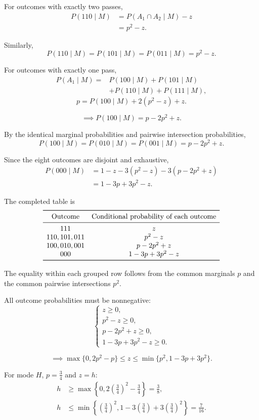 \documentclass[11pt,a4paper]{article}
\newcommand{\Prob}{P}
\begin{document}
\begin{enumerate}
For outcomes with exactly two passes,
\[
\begin{aligned}
\Prob(110\mid M)
&=\Prob(A_1\cap A_2\mid M)-z\\
&=p^2-z.
\end{aligned}
\]

Similarly,
\[
\Prob(110\mid M)
=\Prob(101\mid M)
=\Prob(011\mid M)
=p^2-z.
\]

For outcomes with exactly one pass,
\[
\begin{aligned}
\Prob(A_1\mid M)
={}&\Prob(100\mid M)+\Prob(101\mid M)\\
&+\Prob(110\mid M)+\Prob(111\mid M),
\end{aligned}
\]
\[
p=\Prob(100\mid M)+2(p^2-z)+z.
\]

\[
\implies \Prob(100\mid M)=p-2p^2+z.
\]

By the identical marginal probabilities and pairwise
intersection probabilities,
\[
\Prob(100\mid M)
=\Prob(010\mid M)
=\Prob(001\mid M)
=p-2p^2+z.
\]

Since the eight outcomes are disjoint and exhaustive,
\[
\begin{aligned}
\Prob(000\mid M)
&=1-z-3(p^2-z)-3(p-2p^2+z)\\
&=1-3p+3p^2-z.
\end{aligned}
\]

The completed table is
\[
\begin{array}{cc}
\toprule
\text{Outcome}
&\text{Conditional probability of each outcome}\\
\midrule
111 & z\\
110,101,011 & p^2-z\\
100,010,001 & p-2p^2+z\\
000 & 1-3p+3p^2-z\\
\bottomrule
\end{array}
\]

The equality within each grouped row follows
from the common marginals $p$ and the common
pairwise intersections $p^2$.

All outcome probabilities must be nonnegative:
\[
\begin{cases}
z\ge0,\\
p^2-z\ge0,\\
p-2p^2+z\ge0,\\
1-3p+3p^2-z\ge0.
\end{cases}
\]

\[
\implies
\max\{0,2p^2-p\}
\le z\le
\min\{p^2,1-3p+3p^2\}.
\]

For mode $H$, $p=\frac34$ and $z=h$:
\[
\begin{aligned}
h&\ge\max\left\{
0,2\left(\frac34\right)^2-\frac34
\right\}=\frac38,\\
h&\le\min\left\{
\left(\frac34\right)^2,
1-3\left(\frac34\right)
+3\left(\frac34\right)^2
\right\}=\frac7{16}.
\end{aligned}
\]


\end{enumerate}
\end{document}
